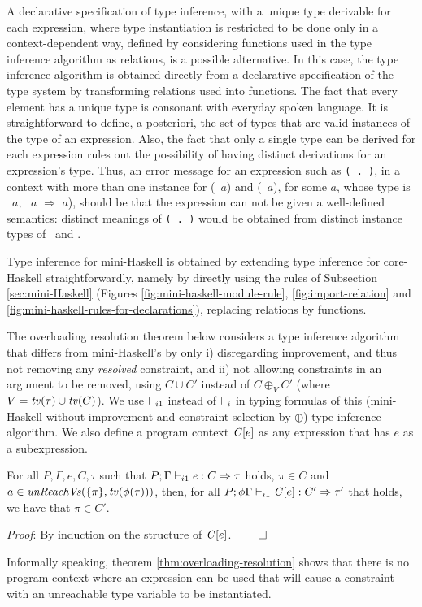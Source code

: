 A declarative specification of type inference, with a unique type
derivable for each expression, where type instantiation is restricted
to be done only in a context-dependent way, defined by considering
functions used in the type inference algorithm as relations, is a
possible alternative. In this case, the type inference algorithm is
obtained directly from a declarative specification of the type system
by transforming relations used into functions. The fact that every
element has a unique type is consonant with everyday spoken
language. It is straightforward to define, a posteriori, the set of
types that are valid instances of the type of an expression.  Also,
the fact that only a single type can be derived for each expression
rules out the possibility of having distinct derivations for an
expression's type. Thus, an error message for an expression such as
{\tt (\sshow\ $\!\!$.$\!\!$ \rread)}, in a context with more than one
instance for (\SShow\ $a$) and (\RRead\ $a$), for some $a$, whose type
is \SShow\ $a$, \RRead\ $a$ $\Rightarrow$ $a$), should be that the
expression can not be given a well-defined semantics: distinct
meanings of {\tt (\sshow\ $\!\!$.$\!\!$ \rread)} would be obtained
from distinct instance types of \sshow\ and \rread.

Type inference for mini-Haskell is obtained by extending type
inference for core-Haskell straightforwardly, namely by directly using
the rules of Subsection \ref{sec:mini-Haskell} (Figures
\ref{fig:mini-haskell-module-rule}, \ref{fig:import-relation} and
\ref{fig:mini-haskell-rules-for-declarations}), replacing relations by
functions.

The overloading resolution theorem below considers a type inference
algorithm that differs from mini-Haskell's by only i) disregarding
improvement, and thus not removing any {\em resolved\/} constraint,
and ii) not allowing constraints in an argument to be removed, using
$C \cup C'$ instead of $C \oplus_V C'$ (where $V = {\it tv\/}(\tau)\cup
{\it tv\/}(C)$). We use $\vdash_{i1}$ instead of $\vdash_i$ in typing formulas of this
(mini-Haskell without improvement and constraint selection by
$\oplus$) type inference algorithm. We also define a program context
$\mathit{C\/}[e]$ as any expression that has $e$ as a subexpression.

\begin{Theorem}
  For all $P, \Gamma, e, C, \tau$ such that $P;\Gamma \vdash_{i1} e:
  C\Rightarrow \tau$ holds, $\pi\in C$ and
  $a\in\text{\it unReachVs\/}(\{\pi\},{\it tv\/}(\phi(\tau)))$, then, for all
  $P;\phi\Gamma\vdash_{i1}\mathit{C\/}[e]: C'\Rightarrow \tau'$ that holds, we have
  that $\pi \in C'$.
\label{thm:overloading-resolution}
\end{Theorem}

{\em Proof\/}: By induction on the structure of $\mathit{C\/}[e]$. $\qed$

Informally speaking, theorem \ref{thm:overloading-resolution} shows
that there is no program context where an expression can be used that
will cause a constraint with an unreachable type variable to be
instantiated.


